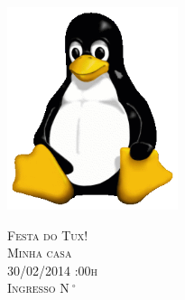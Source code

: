 \documentclass{article}
\newcounter{ingresso}
\begin{document}
\pagestyle{empty}

{
   \vspace{0.7cm}
   \begin{minipage}{10cm}
      \begin{center}
         \includegraphics[width=5cm]{Tux.png}
      \end{center}
   \end{minipage}
   \begin{minipage}{12cm}
      \vspace{.45cm}
      \begin{center}
         \LARGE{\textsc{Festa do Tux!}}\\
         \LARGE{\textsc{Minha casa}}\\
         \LARGE{\textsc{30/02/2014 :00h}}\\
         \textsc{Ingresso N$\ \mbox{}^{\circ}$ }
      \end{center}
      \vspace{.1cm}
   \end{minipage}
}
\end{document}
